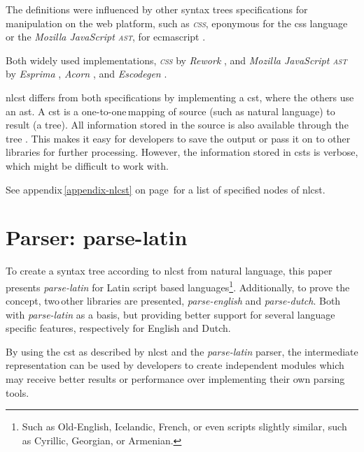 The definitions were influenced by other syntax trees specifications for
  manipulation on the web platform, such as \emph{\textsc{css}}, eponymous
  for the \acrshort{css} language \autocite{reworkcss/css-source-code} or the
  \emph{Mozilla JavaScript \textsc{ast}}, for \gls{ecmascript}
  \autocite{mozilla.org-spidermonkey-parser_api}.

Both widely used implementations, \emph{\textsc{css}} by \emph{Rework}
  \autocite{reworkcss/rework-source-code}, and \emph{Mozilla JavaScript
  \textsc{ast}} by \emph{Esprima} \autocite{ariya/esprima-source-code},
  \emph{Acorn} \autocite{marijnh/acorn-source-code}, and \emph{Escodegen}
  \autocite{constellation/escodegen-source-code}.

\gls{nlcst} differs from both specifications by implementing a \gls{cst},
  where the others use an \gls{ast}.
A \gls{cst} is a one-to-one\,mapping of source (such as natural language)
  to result (a tree).
All information stored in the source is also available through the tree
  \autocite{thegreenplace.net-abstract-concrete-syntax-trees}.
This makes it easy for developers to save the output or pass it on to other
  libraries for further processing.
However, the information stored in \glspl{cst} is verbose, which might be
  difficult to work with.

\medskip\noindent See appendix\,\ref{appendix-nlcst} on
  page\,\pageref{appendix-nlcst} for a list of specified nodes of \gls{nlcst}.

\section{Parser: parse-latin}\label{parser-parse-latin}

To create a syntax tree according to \gls{nlcst} from natural language,
  this paper presents \emph{parse-latin} for Latin script based
  languages\footnote{Such
    as Old-English, Icelandic, French, or even scripts slightly similar, such
    as Cyrillic, Georgian, or Armenian.}.
Additionally, to prove the concept, two\,other libraries are presented,
  \emph{parse-english} and \emph{parse-dutch}.
Both with \emph{parse-latin} as a basis, but providing better support for
  several language specific features, respectively for English and Dutch.

By using the \gls{cst} as described by \gls{nlcst} and the \emph{parse-latin}
  parser, the intermediate representation can be used by developers to
  create independent modules which may receive better results or
  performance over implementing their own parsing tools.

